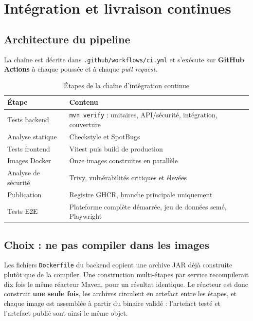 \section{Intégration et livraison continues}

\subsection{Architecture du pipeline}
La chaîne est décrite dans \texttt{.github/workflows/ci.yml} et s'exécute sur
\textbf{GitHub Actions} à chaque poussée et à chaque \emph{pull request}.

\begin{table}[H]\centering\renewcommand{\arraystretch}{1.25}
\begin{tabular}{|p{4cm}|p{9.5cm}|}\hline
\rowcolor{gray!15}\textbf{Étape} & \textbf{Contenu} \\ \hline
Tests backend & \texttt{mvn verify} : unitaires, API/sécurité, intégration, couverture \\ \hline
Analyse statique & Checkstyle et SpotBugs \\ \hline
Tests frontend & Vitest puis build de production \\ \hline
Images Docker & Onze images construites en parallèle \\ \hline
Analyse de sécurité & Trivy, vulnérabilités critiques et élevées \\ \hline
Publication & Registre GHCR, branche principale uniquement \\ \hline
Tests E2E & Plateforme complète démarrée, jeu de données semé, Playwright \\ \hline
\end{tabular}
\caption{Étapes de la chaîne d'intégration continue}\label{tab:pipeline}
\end{table}

\subsection{Choix : ne pas compiler dans les images}
Les fichiers \texttt{Dockerfile} du backend copient une archive JAR déjà construite plutôt
que de la compiler. Une construction multi-étapes par service recompilerait dix fois le même
réacteur Maven, pour un résultat identique. Le réacteur est donc construit \textbf{une
seule fois}, les archives circulent en artefact entre les étapes, et chaque image est
assemblée à partir du binaire validé : l'artefact testé et l'artefact publié sont ainsi le
même objet.

